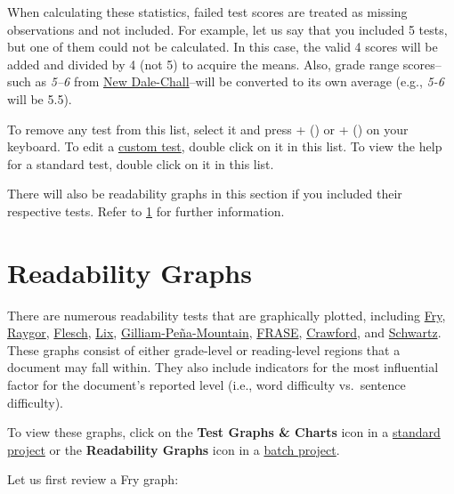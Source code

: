 \documentclass[
]{book}
\theoremstyle{definition}
\theoremstyle{definition}
\theoremstyle{definition}
\theoremstyle{definition}
\theoremstyle{remark}
\begin{document}
When calculating these statistics, failed test scores are treated as missing observations and not included. For example, let us say that you included 5 tests, but one of them could not be calculated. In this case, the valid 4 scores will be added and divided by 4 (not 5) to acquire the means. Also, grade range scores--such as \emph{5--6} from \protect\hyperlink{dale-chall-test}{New Dale-Chall}--will be converted to its own average (e.g., \emph{5-6} will be 5.5).

To remove any test from this list, select it and press + (\faWindows) or \keys{\cmd}+\keys{\backdel} (\faApple) on your keyboard. To edit a \protect\hyperlink{creating-custom-test}{custom test}, double click on it in this list. To view the help for a standard test, double click on it in this list.

There will also be readability graphs in this section if you included their respective tests. Refer to \ref{reviewing-readability-graphs} for further information.

\hypertarget{reviewing-readability-graphs}{%
\section{Readability Graphs}\label{reviewing-readability-graphs}}

There are numerous readability tests that are graphically plotted, including \protect\hyperlink{fry-test}{Fry}, \protect\hyperlink{raygor-test}{Raygor}, \protect\hyperlink{flesch-test}{Flesch}, \protect\hyperlink{lix-test}{Lix}, \protect\hyperlink{gilliam-pena-mountain-fry-graph}{Gilliam-Peña-Mountain}, \protect\hyperlink{frase}{FRASE}, \protect\hyperlink{crawford}{Crawford}, and \protect\hyperlink{scwartz}{Schwartz}. These graphs consist of either grade-level or reading-level regions that a document may fall within. They also include indicators for the most influential factor for the document's reported level (i.e., word difficulty vs.~sentence difficulty).

To view these graphs, click on the \textbf{Test Graphs \& Charts} icon in a \protect\hyperlink{creating-standard-project}{standard project} or the \textbf{Readability Graphs} icon in a \protect\hyperlink{creating-batch-project}{batch project}.

Let us first review a Fry graph:
\end{document}
